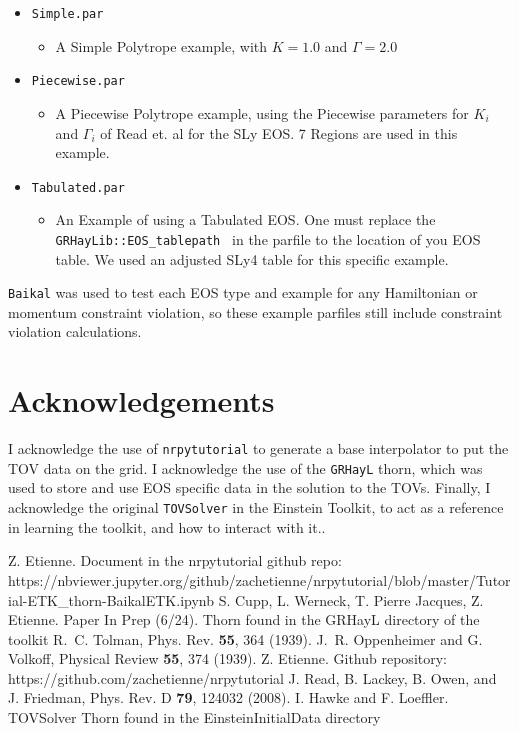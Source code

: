 \begin{itemize}
    \item {\tt Simple.par }
    \begin{itemize}
    \item A Simple Polytrope example, with $K=1.0$ and $\Gamma=2.0$
    \end{itemize}
    \item {\tt Piecewise.par }
    \begin{itemize}
    \item A Piecewise Polytrope example, using the Piecewise parameters for $K_i$ and $\Gamma_i$ of Read et. al for the SLy EOS.\cite{Read} 7 Regions are used in this example.
    \end{itemize}
    \item {\tt Tabulated.par }
    \begin{itemize}
    \item An Example of using a Tabulated EOS. One must replace the {\tt GRHayLib::EOS\_tablepath } in the parfile to the location of you EOS table. We used an adjusted SLy4 table for this specific example.
    \end{itemize}
\end{itemize}

{\tt Baikal} was used to test each EOS type and example for any Hamiltonian or momentum constraint violation, so these example parfiles still include constraint violation calculations.

\section{Acknowledgements}

I acknowledge the use of {\tt nrpytutorial}\cite{NRpy} to generate a base interpolator to put the TOV data on the grid. I acknowledge the use of the {\tt GRHayL} thorn, which was used to store and use EOS specific data in the solution to the TOVs. Finally, I acknowledge the original {\tt TOVSolver} in the Einstein Toolkit, to act as a reference in learning the toolkit, and how to interact with it.\cite{Hawke}.

\begin{thebibliography}{9}
Z. Etienne. Document in the nrpytutorial github repo: https://nbviewer.jupyter.org/github/zachetienne/nrpytutorial/blob/master/Tutorial-ETK\_thorn-BaikalETK.ipynb
%
S. Cupp, L. Werneck, T. Pierre Jacques, Z. Etienne. Paper In Prep (6/24). Thorn found in the GRHayL directory of the toolkit
%
R.~C. Tolman, Phys. Rev. {\bf 55}, 364 (1939).
%
J.~R. Oppenheimer and G. Volkoff, Physical Review {\bf 55}, 374 (1939).
%
Z. Etienne. Github repository: https://github.com/zachetienne/nrpytutorial
%
J. Read, B. Lackey, B. Owen, and J. Friedman, Phys. Rev. D {\bf 79}, 124032 (2008).
%
I. Hawke and F. Loeffler. TOVSolver Thorn found in the EinsteinInitialData directory
%
\end{thebibliography}



